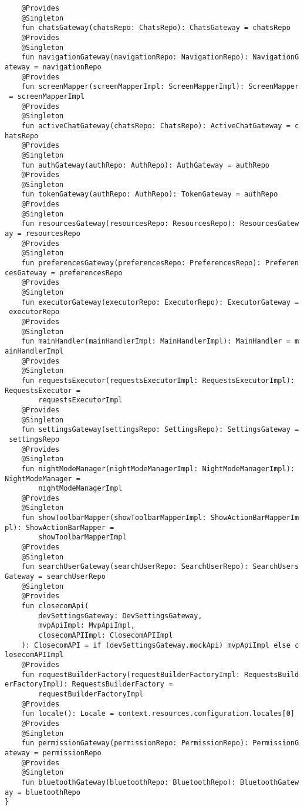 \documentclass[listing]{espd}
\begin{document}
\begin{verbatim}
    @Provides
    @Singleton
    fun chatsGateway(chatsRepo: ChatsRepo): ChatsGateway = chatsRepo
    @Provides
    @Singleton
    fun navigationGateway(navigationRepo: NavigationRepo): NavigationG
ateway = navigationRepo
    @Provides
    fun screenMapper(screenMapperImpl: ScreenMapperImpl): ScreenMapper
 = screenMapperImpl
    @Provides
    @Singleton
    fun activeChatGateway(chatsRepo: ChatsRepo): ActiveChatGateway = c
hatsRepo
    @Provides
    @Singleton
    fun authGateway(authRepo: AuthRepo): AuthGateway = authRepo
    @Provides
    @Singleton
    fun tokenGateway(authRepo: AuthRepo): TokenGateway = authRepo
    @Provides
    @Singleton
    fun resourcesGateway(resourcesRepo: ResourcesRepo): ResourcesGatew
ay = resourcesRepo
    @Provides
    @Singleton
    fun preferencesGateway(preferencesRepo: PreferencesRepo): Preferen
cesGateway = preferencesRepo
    @Provides
    @Singleton
    fun executorGateway(executorRepo: ExecutorRepo): ExecutorGateway =
 executorRepo
    @Provides
    @Singleton
    fun mainHandler(mainHandlerImpl: MainHandlerImpl): MainHandler = m
ainHandlerImpl
    @Provides
    @Singleton
    fun requestsExecutor(requestsExecutorImpl: RequestsExecutorImpl): 
RequestsExecutor =
        requestsExecutorImpl
    @Provides
    @Singleton
    fun settingsGateway(settingsRepo: SettingsRepo): SettingsGateway =
 settingsRepo
    @Provides
    @Singleton
    fun nightModeManager(nightModeManagerImpl: NightModeManagerImpl): 
NightModeManager =
        nightModeManagerImpl
    @Provides
    @Singleton
    fun showToolbarMapper(showToolbarMapperImpl: ShowActionBarMapperIm
pl): ShowActionBarMapper =
        showToolbarMapperImpl
    @Provides
    @Singleton
    fun searchUserGateway(searchUserRepo: SearchUserRepo): SearchUsers
Gateway = searchUserRepo
    @Singleton
    @Provides
    fun closecomApi(
        devSettingsGateway: DevSettingsGateway,
        mvpApiImpl: MvpApiImpl,
        closecomAPIImpl: ClosecomAPIImpl
    ): ClosecomAPI = if (devSettingsGateway.mockApi) mvpApiImpl else c
losecomAPIImpl
    @Provides
    fun requestBuilderFactory(requestBuilderFactoryImpl: RequestsBuild
erFactoryImpl): RequestsBuilderFactory =
        requestBuilderFactoryImpl
    @Provides
    fun locale(): Locale = context.resources.configuration.locales[0]
    @Provides
    @Singleton
    fun permissionGateway(permissionRepo: PermissionRepo): PermissionG
ateway = permissionRepo
    @Provides
    @Singleton
    fun bluetoothGateway(bluetoothRepo: BluetoothRepo): BluetoothGatew
ay = bluetoothRepo
}
\end{verbatim}
\end{document}
